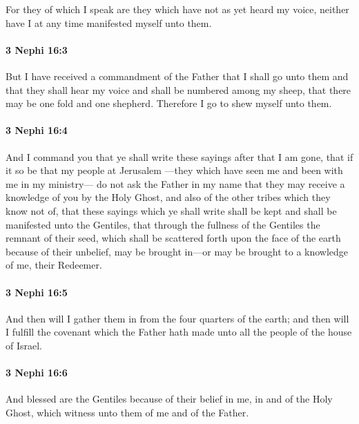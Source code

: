 			For they of which I speak are they which have not as yet heard my voice,
			neither have I at any time manifested myself unto them.

		\paragraph{3 Nephi 16:3} %
			\label{3NEPHI-16-3}

			But I have received a commandment of the Father that I shall go unto them
			and that they shall hear my voice and shall be numbered among my sheep,
			that there may be one fold and one shepherd.
			Therefore I go to shew myself unto them.

		\paragraph{3 Nephi 16:4} %
			\label{3NEPHI-16-4}

			And I command you that ye shall write these sayings after that I am gone,
			that if it so be that my people at Jerusalem
			---they which have seen me and been with me in my ministry---
			do not ask the Father in my name
			that they may receive a knowledge of you by the Holy Ghost,
			and also of the other tribes which they know not of,
			that these sayings which ye shall write shall be kept
			and shall be manifested unto the Gentiles,
			that through the fullness of the Gentiles
			the remnant of their seed,
			which shall be scattered forth upon the face of the earth because of their unbelief,
			may be brought in---or may be brought to a knowledge of me, their Redeemer.

		\paragraph{3 Nephi 16:5} %
			\label{3NEPHI-16-5}

			And then will I gather them in from the four quarters of the earth;
			and then will I fulfill the covenant
			which the Father hath made unto all the people of the house of Israel.

		\paragraph{3 Nephi 16:6} %
			\label{3NEPHI-16-6}

			And blessed are the Gentiles because of their belief in me,
			in and of the Holy Ghost, which witness unto them of me and of the Father.

